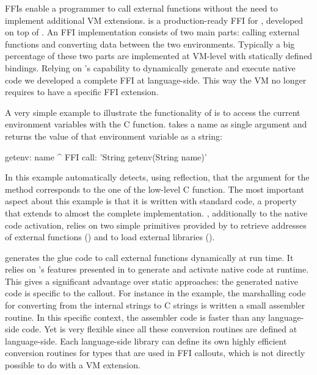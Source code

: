 FFIs enable a programmer to call external functions without the need to implement additional VM extensions.
\NB \cite{Brun13a} is a production-ready FFI for \PH, developed on top of \B.
An FFI implementation consists of two main parts: calling external functions and converting data between the two environments.
Typically a big percentage of these two parts are implemented at VM-level with statically defined bindings.
Relying on \B's capability to dynamically generate and execute native code we developed a complete FFI at language-side.
This way the VM no longer requires to have a specific FFI extension.

A very simple example to illustrate the functionality of \NB is to access the current environment variables with the  C function.
 takes a name as single argument and returns the value of that environment variable as a string:
%
\begin{stcode}{4}
getenv: name
    ^ FFI call: 'String getenv(String name)'
\end{stcode}
%
In this example \NB automatically detects, using reflection, that the argument for the \PH method corresponds to the one of the low-level C function.
The most important aspect about this example is that it is written with standard \ST code, a property that extends to almost the complete implementation.
\NB, additionally to the native code activation, relies on two simple primitives provided by \B to retrieve addresses of external functions () and to load external libraries ().

\NB generates the glue code to call external functions dynamically at run time.
It relies on \B's features presented in  to generate and activate native code at runtime.
This gives \NB a significant advantage over static approaches: the generated native code is specific to the callout.
For instance in the  example, the marshalling code for converting from the internal \PH strings to C strings is written a small assembler routine.
In this specific context, the assembler code is faster than any language-side code.
Yet \NB is very flexible since all these conversion routines are defined at language-side. 
Each language-side library can define its own highly efficient conversion routines for types that are used in FFI callouts, which is not directly possible to do with a VM extension.


